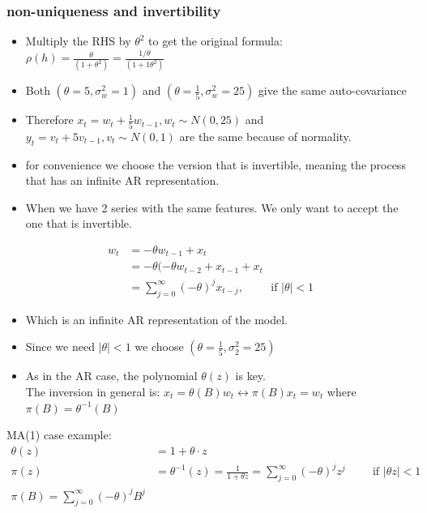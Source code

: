 \documentclass{article}
\begin{document}
\subsubsection{non-uniqueness and invertibility}

\begin{itemize}
    \item Multiply the RHS by $\theta^2$ to get the original formula:\\
    $\rho(h) = \frac{\theta}{(1+ \theta^2)} = \frac{1/\theta}{( 1 + 1\theta^2)}$
    \item Both $(\theta = 5, \sigma^2_w = 1)$ and $(\theta = \frac{1}{5}, \sigma^2_w = 25)$ give the same auto-covariance
    \item Therefore $x_t = w_t + \frac{1}{5} w_{t-1} , w_t \sim N(0,25)$ and $y_t = v_t + 5v_{t-1} , v_t \sim N(0,1)$ are the same because of normality.
    \item for convenience we choose the version that is invertible, meaning the process that has an infinite AR representation.
    \item When we have 2 series with the same features. We only want to accept the one that is invertible.
\end{itemize}

\begin{align*}
    w_t &= - \theta w_{t-1} + x_t\\
    &= -\theta (-\theta w_{t-2} + x_{t-1} + x_t\\
    &= \sum_{j=0}^\infty (-\theta)^j x_{t-j}, \hspace{1cm} \text{if } |\theta| < 1
\end{align*}
\begin{itemize}
    \item Which is an infinite AR representation of the model.
    \item Since we need $|\theta| < 1$ we choose $(\theta = \frac{1}{5}, \sigma^2_2 = 25)$
    \item As in the AR case, the polynomial $\theta(z)$ is key.\\
    The inversion in general is: $x_t = \theta(B) w_t \leftrightarrow  \pi (B) x_t = w_t$ where $\pi(B) = \theta^{-1} (B)$
\end{itemize}

MA(1) case example:
\begin{align*}
    \theta(z) &= 1 + \theta \cdot z\\
    \pi(z) &= \theta^{-1} (z) = \frac{1}{1 + \theta z} = \sum_{j=0}^\infty (-\theta)^j z^j \hspace{1cm} \text{if } |\theta z| < 1\\
    \pi(B) = \sum_{j=0}^\infty (-\theta)^j B^j
\end{align*}
\end{document}
